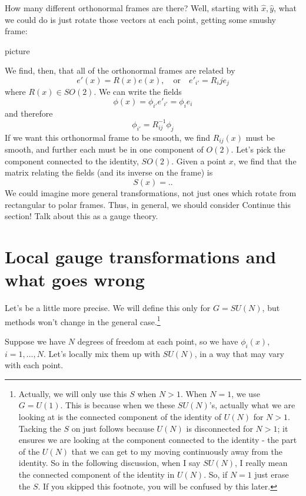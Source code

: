 \documentclass[main.tex]{subfiles}
\begin{document}
How many different orthonormal frames are there? Well, starting with $\hat{x},\hat{y}$, what we could do is just rotate those vectors at each point, getting some smushy frame:

picture

We find, then, that all of the orthonormal frames are related by
\[
e' (x) = R(x) e (x), \quad \text{or} \quad e'_{i'} = R_ij e_j
\]
where $R(x) \in SO(2)$. We can write the fields
\[
\phi (x) = \phi_{i'} e'_{i'}= \phi_i e_i
\]
and therefore
\[
\phi_{i'} = R^{-1}_{ij} \phi_j
\]
If we want this orthonormal frame to be smooth, we find $R_{ij} (x)$ must be smooth, and further each must be in one component of $O(2)$. Let's pick the component connected to the identity, $SO(2)$. Given a point $x$, we find that the matrix relating the fields (and its inverse on the frame) is
\[
S(x) = ..
\]
We could imagine more general transformations, not just ones which rotate from rectangular to polar frames. Thus, in general, we should consider 
Continue this section! Talk about this as a gauge theory.

\section{Local gauge transformations and what goes wrong}

Let's be a little more precise. We will define this only for $G = SU(N)$, but methods won't change in the general case.\footnote{Actually, we will only use this $S$ when $N > 1$. When $N = 1$, we use $G = U(1)$. This is because when we these $SU(N)$'s, actually what we are looking at is the connected component of the identity of $U(N)$ for $N > 1$. Tacking the $S$ on just follows because $U(N)$ is disconnected for $N > 1$; it ensures we are looking at the component connected to the identity - the part of the $U(N)$ that we can get to my moving continuously away from the identity. So in the following discussion, when I say $SU(N)$, I really mean the connected component of the identity in $U(N)$. So, if $N=1$ just erase the $S$. If you skipped this footnote, you will be confused by this later.}
 
Suppose we have $N$ degrees of freedom at each point, so we have $\phi_i (x)$, $i = 1,...,N$. Let's locally mix them up with $SU(N)$, in a way that may vary with each point.
\end{document}

